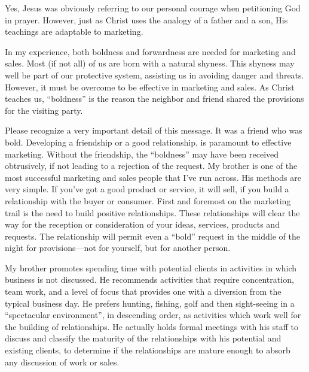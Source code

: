 \documentclass[12pt]{memoir}
\begin{document}
Yes, Jesus was obviously referring to our personal courage when petitioning
God in prayer. However, just as Christ uses the analogy of a father
and a son, His teachings are adaptable to marketing.

In my experience, both boldness and forwardness are needed for marketing
and sales. Most (if not all) of us are born with a natural shyness.
This shyness may well be part of our protective system, assisting
us in avoiding danger and threats. However, it must be overcome to
be effective in marketing and sales. As Christ teaches us, ``boldness''
is the reason the neighbor and friend shared the provisions for the
visiting party. 

Please recognize a very important detail of this message. It was a
friend who was bold. Developing a friendship or a good relationship,
is paramount to effective marketing. Without the friendship, the ``boldness''
may have been received obtrusively, if not leading to a rejection
of the request. My brother is one of the most successful marketing
and sales people that I've run across. His methods are very simple.
If you've got a good product or service, it will sell, if you build
a relationship with the buyer or consumer. First and foremost on the
marketing trail is the need to build positive relationships. These
relationships will clear the way for the reception or consideration
of your ideas, services, products and requests. The relationship will
permit even a ``bold'' request in the middle of the night for provisions---not
for yourself, but for another person.

My brother promotes spending time with potential clients in activities
in which business is not discussed. He recommends activities that
require concentration, team work, and a level of focus that provides
one with a diversion from the typical business day. He prefers hunting,
fishing, golf and then sight-seeing in a ``spectacular environment'',
in descending order, as activities which work well for the building
of relationships. He actually holds formal meetings with his staff
to discuss and classify the maturity of the relationships with his
potential and existing clients, to determine if the relationships
are mature enough to absorb any discussion of work or sales.
\end{document}
